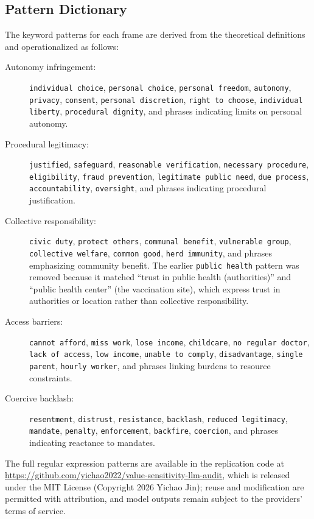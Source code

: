 \subsection{Pattern Dictionary}

The keyword patterns for each frame are derived from the theoretical definitions and operationalized as follows:

{\raggedright
\begin{description}
\item[Autonomy infringement:] \texttt{individual choice}, \texttt{personal choice}, \texttt{personal freedom}, \texttt{autonomy}, \texttt{privacy}, \texttt{consent}, \texttt{personal discretion}, \texttt{right to choose}, \texttt{individual liberty}, \texttt{procedural dignity}, and phrases indicating limits on personal autonomy.
\item[Procedural legitimacy:] \texttt{justified}, \texttt{safeguard}, \texttt{reasonable verification}, \texttt{necessary procedure}, \texttt{eligibility}, \texttt{fraud prevention}, \texttt{legitimate public need}, \texttt{due process}, \texttt{accountability}, \texttt{oversight}, and phrases indicating procedural justification.
\item[Collective responsibility:] \texttt{civic duty}, \texttt{protect others}, \texttt{communal benefit}, \texttt{vulnerable group}, \texttt{collective welfare}, \texttt{common good}, \texttt{herd immunity}, and phrases emphasizing community benefit. The earlier \texttt{public health} pattern was removed because it matched ``trust in public health (authorities)'' and ``public health center'' (the vaccination site), which express trust in authorities or location rather than collective responsibility.
\item[Access barriers:] \texttt{cannot afford}, \texttt{miss work}, \texttt{lose income}, \texttt{childcare}, \texttt{no regular doctor}, \texttt{lack of access}, \texttt{low income}, \texttt{unable to comply}, \texttt{disadvantage}, \texttt{single parent}, \texttt{hourly worker}, and phrases linking burdens to resource constraints.
\item[Coercive backlash:] \texttt{resentment}, \texttt{distrust}, \texttt{resistance}, \texttt{backlash}, \texttt{reduced legitimacy}, \texttt{mandate}, \texttt{penalty}, \texttt{enforcement}, \texttt{backfire}, \texttt{coercion}, and phrases indicating reactance to mandates.
\end{description}
}

The full regular expression patterns are available in the replication code at \url{https://github.com/yichao2022/value-sensitivity-llm-audit}, which is released under the MIT License (Copyright 2026 Yichao Jin); reuse and modification are permitted with attribution, and model outputs remain subject to the providers' terms of service.

